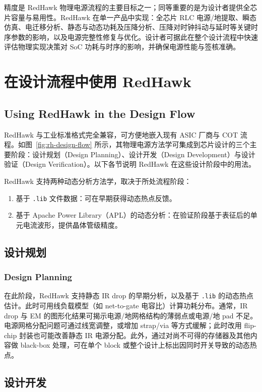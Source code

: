 精度是 RedHawk 物理电源流程的主要目标之一；同等重要的是为设计者提供全芯片容量与易用性。RedHawk 在单一产品中实现：全芯片 RLC 电源/地提取、瞬态仿真、电迁移分析、静态与动态功耗及压降分析、压降对时钟抖动与延时等关键时序参数的影响，以及电源完整性修复与优化。设计者可据此在整个设计流程中快速评估物理实现决策对 SoC 功耗与时序的影响，并确保电源性能与签核准确。

\section{在设计流程中使用 RedHawk}
\subsection*{Using RedHawk in the Design Flow}

RedHawk 与工业标准格式完全兼容，可方便地嵌入现有 ASIC 厂商与 COT 流程。如图~\ref{fig:rh-design-flow} 所示，其物理电源方法学可集成到芯片设计的三个主要阶段：设计规划（Design Planning）、设计开发（Design Development）与设计验证（Design Verification）。以下各节说明 RedHawk 在这些设计阶段中的用法。

RedHawk 支持两种动态分析方法学，取决于所处流程阶段：
\begin{enumerate}
  \item 基于 \texttt{.lib} 文件数据：可在早期获得动态热点反馈。
  \item 基于 Apache Power Library（APL）的动态分析：在验证阶段基于表征后的单元电流波形，提供晶体管级精度。
\end{enumerate}

\subsection{设计规划}
\subsubsection*{Design Planning}

在此阶段，RedHawk 支持静态 IR drop 的早期分析，以及基于 \texttt{.lib} 的动态热点估计。此时可用线负载模型（如 net-to-gate 电容比）计算功耗分布。通常，IR drop 与 EM 的图形化结果可揭示电源/地网格结构的薄弱点或电源/地 pad 不足。电源网格分配问题可通过线宽调整，或增加 strap/via 等方式缓解；此时改用 flip-chip 封装也可能改善静态 IR 电源分配。此外，通过对尚不可得的存储器及其他内容做 black-box 处理，可在单个 block 或整个设计上标出因同时开关导致的动态热点。

\subsection{设计开发}
